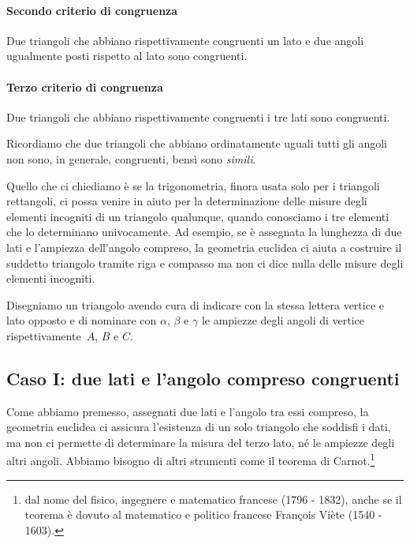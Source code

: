 \paragraph{Secondo criterio di congruenza}
Due triangoli che abbiano rispettivamente congruenti un lato e due
angoli ugualmente posti rispetto al lato sono congruenti.

\paragraph{Terzo criterio di congruenza}
Due triangoli che abbiano rispettivamente congruenti i tre lati sono congruenti.

\osservazione Ricordiamo che due triangoli che abbiano ordinatamente uguali tutti gli angoli non sono, in generale, congruenti, bensì sono \emph{simili}.

Quello che ci chiediamo è se la trigonometria, finora usata solo per i triangoli rettangoli, ci possa venire in aiuto per la
determinazione delle misure degli elementi incogniti di un triangolo qualunque, quando conosciamo i tre elementi che lo
determinano univocamente. Ad esempio, se è assegnata la lunghezza di due lati e l'ampiezza dell'angolo compreso,
la geometria euclidea ci aiuta a costruire il suddetto triangolo tramite riga e compasso ma non ci dice nulla delle
misure degli elementi incogniti.

Disegniamo un triangolo avendo cura di indicare con la stessa lettera vertice e lato opposto e di nominare con
$\alpha$, $\beta$ e $\gamma$ le ampiezze degli angoli di vertice rispettivamente~$A$, $B$ e $C$.
\begin{center}
 
\end{center}

\subsection{Caso I: due lati e l'angolo compreso congruenti}

Come abbiamo premesso, assegnati due lati e l'angolo tra essi compreso, la geometria euclidea ci assicura l'esistenza
di un solo triangolo che soddisfi i dati, ma non ci permette di determinare la misura del terzo lato, né le ampiezze degli altri angoli.
Abbiamo bisogno di altri strumenti come il teorema di Carnot.\footnote{dal nome del fisico, ingegnere e matematico francese (1796 - 1832), anche se il teorema è dovuto al matematico e politico francese François Viète (1540 - 1603).}


